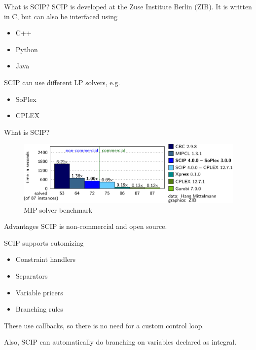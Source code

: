 \documentclass[fleqn]{beamer}
\begin{document}
    \begin{frame}{What is SCIP?}
        SCIP is developed at the Zuse Institute Berlin (ZIB).
        It is written in C, but can also be interfaced using
        \begin{itemize}
            \item C++
            \item Python
            \item Java
        \end{itemize}
    
        SCIP can use different LP solvers, e.g.
        \begin{itemize}
            \item SoPlex %
            \item CPLEX
        \end{itemize}
    \end{frame}

    \begin{frame}{What is SCIP?}
        \begin{figure}
            \includegraphics{comparison}
            \caption{MIP solver benchmark}
        \end{figure}
    \end{frame}

    \begin{frame}{Advantages}
        SCIP is non-commercial and open source.
    
        SCIP supports cutomizing
        \begin{itemize}
            \item Constraint handlers %
            \item Separators
            \item Variable pricers
            \item Branching rules
        \end{itemize}
        These use callbacks, so there is no need for a custom control loop.
        
        Also, SCIP can automatically do branching on variables declared as integral.
    \end{frame}
	
\end{document}
